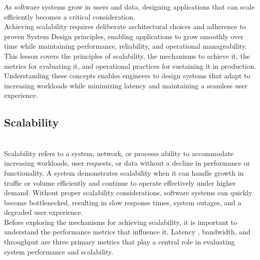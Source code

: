 

As software systems grow in users and data, designing applications that can scale efficiently becomes a critical consideration.
\\
Achieving scalability requires deliberate architectural choices and adherence to proven System Design principles, enabling applications to grow smoothly over time while maintaining performance, reliability, and operational manageability.
\\
This lesson covers the principles of scalability, the mechanisms to achieve it, the metrics for evaluating it, and operational practices for sustaining it in production. Understanding these concepts enables engineers to design systems that adapt to increasing workloads while minimizing latency and maintaining a seamless user experience.

\subsection{Scalability}\label{dYgWgPP97Xz2rsaN_hRkQ}
\\
Scalability refers to a system, network, or process\textquotesingle s ability to accommodate increasing workloads, user requests, or data without a decline in performance or functionality. A system demonstrates scalability when it can handle growth in traffic or volume efficiently and continue to operate effectively under higher demand. Without proper scalability considerations, software systems can quickly become bottlenecked, resulting in slow response times, system outages, and a degraded user experience.
\\
Before exploring the mechanisms for achieving scalability, it is important to understand the performance metrics that influence it. Latency , bandwidth, and throughput are three primary metrics that play a central role in evaluating system performance and scalability.

